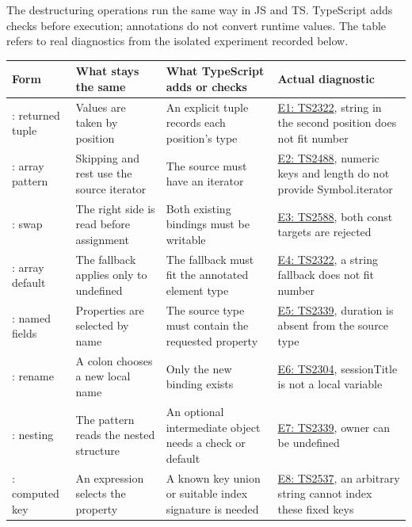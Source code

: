 \documentclass[
  11pt,
]{article}
\newcounter{none} %
\begin{document}
The destructuring operations run the same way in JS and TS. TypeScript
adds checks before execution; annotations do not convert runtime values.
The table refers to real diagnostics from the isolated experiment
recorded below.

{\def\LTcaptype{none} %
\begin{longtable}[]{@{}
  >{\raggedright\arraybackslash}p{}
  >{\raggedright\arraybackslash}p{}
  >{\raggedright\arraybackslash}p{}
  >{\raggedright\arraybackslash}p{}@{}}
\toprule\noalign{}
\begin{minipage}[b]{\linewidth}\raggedright
Form
\end{minipage} & \begin{minipage}[b]{\linewidth}\raggedright
What stays the same
\end{minipage} & \begin{minipage}[b]{\linewidth}\raggedright
What TypeScript adds or checks
\end{minipage} & \begin{minipage}[b]{\linewidth}\raggedright
Actual diagnostic
\end{minipage} \\
\midrule\noalign{}
\endhead
\bottomrule\noalign{}
\endlastfoot
1: returned tuple & Values are taken by position & An explicit tuple
records each position's type & \hyperref[e1-returned-tuple]{E1: TS2322},
string in the second position does not fit number \\
2: array pattern & Skipping and rest use the source iterator & The
source must have an iterator & \hyperref[e2-iterable-source]{E2:
TS2488}, numeric keys and length do not provide Symbol.iterator \\
3: swap & The right side is read before assignment & Both existing
bindings must be writable & \hyperref[e3-writable-swap-targets]{E3:
TS2588}, both const targets are rejected \\
4: array default & The fallback applies only to undefined & The fallback
must fit the annotated element type &
\hyperref[e4-array-default-type]{E4: TS2322}, a string fallback does not
fit number \\
5: named fields & Properties are selected by name & The source type must
contain the requested property & \hyperref[e5-existing-property]{E5:
TS2339}, duration is absent from the source type \\
6: rename & A colon chooses a new local name & Only the new binding
exists & \hyperref[e6-renamed-binding]{E6: TS2304}, sessionTitle is not
a local variable \\
9: nesting & The pattern reads the nested structure & An optional
intermediate object needs a check or default &
\hyperref[e7-optional-nested-object]{E7: TS2339}, owner can be
undefined \\
10: computed key & An expression selects the property & A known key
union or suitable index signature is needed &
\hyperref[e8-computed-key]{E8: TS2537}, an arbitrary string cannot index
these fixed keys \\
\end{longtable}
}
\end{document}
